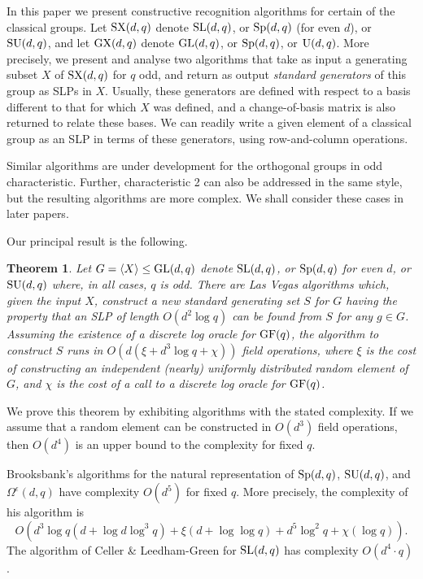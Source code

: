 \documentclass[12pt]{article}
\newtheorem{theorem}[definition]{Theorem}
\def\SL{{\rm SL}}
\def\GL{{\rm GL}}
\def\U{{\rm U}}
\def\GF{{\rm GF}}
\def\Sp{{\rm Sp}}
\def\SU{{\rm SU}}
\def\SX{{\rm SX}}
\def\GX{{\rm GX}}
\begin{document}
In this paper we present constructive
recognition algorithms for certain of the classical groups.
Let $\SX(d,q)$ denote $\SL(d,q)$, or $\Sp(d,q)$ (for 
even $d$), or $\SU(d,q)$, and let $\GX(d,q)$ denote
$\GL(d,q)$, or $\Sp(d,q)$, or $\U(d,q)$. 
More precisely, we present and analyse two algorithms that
take as input a generating subset $X$ of $\SX(d,q)$ for $q$ odd, and
return as output {\it standard generators} of this group as 
SLPs in $X$. Usually, these  
generators are defined with respect to a 
basis different to that for which $X$ was defined, 
and a change-of-basis 
matrix is also returned to relate these bases.
We can readily write a given element of a classical group 
as an SLP in terms of these generators, using row-and-column operations.

Similar algorithms are under development for the orthogonal groups
in odd characteristic.  Further, characteristic 2 can also be 
addressed in the same style, but the resulting algorithms are more complex.
We shall consider these cases in later papers.

Our principal result is the following.
\begin{theorem} \label{main}
Let $G = \langle X \rangle \leq \GL(d, q)$ denote 
$\SL(d,q)$, or $\Sp(d,q)$ for even $d$, or $\SU(d,q)$
where, in all cases, $q$ is odd. 
There are Las Vegas algorithms which,
given the input $X$, 
construct a new standard generating set $S$ 
for $G$ having the property that 
an SLP of length $O(d^2 \log q)$
can be found from $S$ for any $g \in G$. 
Assuming the existence of a discrete log oracle 
for $\GF (q)$, 
the algorithm to construct
$S$ runs in $O(d (\xi + d^3 \log q + \chi))$ field operations, 
where $\xi$ is the cost of constructing an independent 
(nearly) uniformly distributed random element of $G$,
and $\chi$ is the cost of a call to a discrete log oracle for $\GF(q)$.
\end{theorem}

We prove this theorem by exhibiting algorithms
with the stated complexity. If we assume that
a random element can be constructed in 
$O(d^3)$ field operations, then $O(d^4)$ is 
an upper bound to the complexity for fixed $q$. 

Brooksbank's algorithms \cite{Brooksbank03} 
for the natural 
representation of $\Sp(d, q)$, $\SU(d, q)$, and $\Omega^\epsilon(d, q)$ 
have complexity $O(d^5)$ for fixed $q$. More precisely, 
the complexity of his algorithm is 
$$O(d^3 \log q (d + \log d \log^3 q) + \xi(d + \log \log q) + d^5 \log^2 q
   + \chi(\log q)).$$
The algorithm of Celler \& Leedham-Green \cite{CellerLeedhamGreen98}
for $\SL(d, q)$ has complexity $O(d^4 \cdot q)$.
\end{document}
